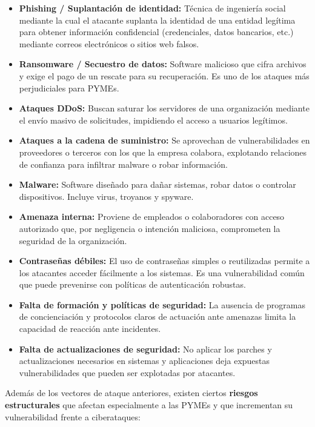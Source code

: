 \documentclass[a4paper, 10pt]{article}
\begin{document}
\begin{itemize}
  \item \textbf{Phishing / Suplantación de identidad:} Técnica de ingeniería social mediante la cual el atacante suplanta la identidad de una entidad legítima para obtener información confidencial (credenciales, datos bancarios, etc.) mediante correos electrónicos o sitios web falsos.
  \item \textbf{Ransomware / Secuestro de datos:} Software malicioso que cifra archivos y exige el pago de un rescate para su recuperación. Es uno de los ataques más perjudiciales para PYMEs.
  \item \textbf{Ataques DDoS:} Buscan saturar los servidores de una organización mediante el envío masivo de solicitudes, impidiendo el acceso a usuarios legítimos.
  \item \textbf{Ataques a la cadena de suministro:} Se aprovechan de vulnerabilidades en proveedores o terceros con los que la empresa colabora, explotando relaciones de confianza para infiltrar malware o robar información.
  \item \textbf{Malware:} Software diseñado para dañar sistemas, robar datos o controlar dispositivos. Incluye virus, troyanos y spyware.
  \item \textbf{Amenaza interna:} Proviene de empleados o colaboradores con acceso autorizado que, por negligencia o intención maliciosa, comprometen la seguridad de la organización.
  \item \textbf{Contraseñas débiles:} El uso de contraseñas simples o reutilizadas permite a los atacantes acceder fácilmente a los sistemas. Es una vulnerabilidad común que puede prevenirse con políticas de autenticación robustas.
  \item \textbf{Falta de formación y políticas de seguridad:} La ausencia de programas de concienciación y protocolos claros de actuación ante amenazas limita la capacidad de reacción ante incidentes.
  \item \textbf{Falta de actualizaciones de seguridad:} No aplicar los parches y actualizaciones necesarios en sistemas y aplicaciones deja expuestas vulnerabilidades que pueden ser explotadas por atacantes.
\end{itemize}



\par\vspace{0.5cm}
Además de los vectores de ataque anteriores, existen ciertos \textbf{riesgos estructurales} que afectan especialmente a las PYMEs y que incrementan su vulnerabilidad frente a ciberataques:
\end{document}
